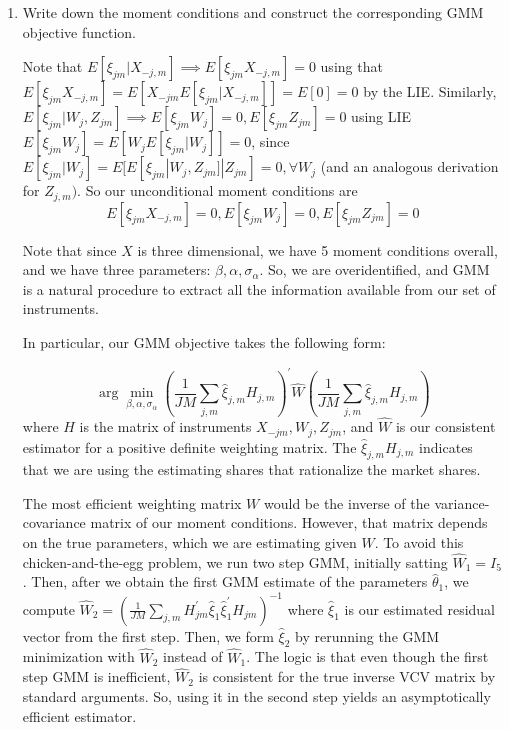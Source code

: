 \documentclass{article}
\begin{document}
\begin{enumerate}
\begin{enumerate}
    \item Write down the moment conditions and construct the corresponding GMM objective
function.
\begin{answer}
Note that $E[\xi_{jm} | X_{-j,m}] \implies E[\xi_{jm} X_{-j,m}]=0$ using that $E[\xi_{jm} X_{-j,m}]= E[X_{-jm} E[\xi_{jm} |X_{-j,m}]]=E[0]=0$ by the LIE. Similarly, $E[\xi_{jm} | W_j,Z_{jm}] \implies E[\xi_{jm}W_j] = 0, E[\xi_{jm} Z_{jm}]=0$ using LIE $E[\xi_{jm} W_{j}]= E[W_{j} E[\xi_{jm} |W_{j}]]= 0$,  since $E[\xi_{jm} |W_{j}] = E[E[\xi_{jm} |W_{j},Z_{{jm}}]|Z_{jm}] =0, \forall W_{j} $ (and an analogous derivation for $Z_{j,m} )$. So our unconditional moment conditions are 
    $$  E[\xi_{jm} X_{-j,m}]=0,E[\xi_{jm}W_j] = 0, E[\xi_{jm} Z_{jm}]=0 $$

    Note that since $X$ is three dimensional, we have 5 moment conditions overall, and we have three parameters: $\beta, \alpha, \sigma_{\alpha}$. So, we are overidentified, and GMM is a natural procedure to extract all the information available from our set of instruments. 

    In particular, our GMM objective takes the following form:

    $$ \arg \min_{\beta,\alpha,\sigma_{\alpha}} \left( \frac{1}{JM} \sum_{j,m} \hat \xi_{j,m}H_{j,m} \right)^\prime \hat W \left( \frac{1}{JM} \sum_{j,m} \hat\xi_{j,m}H_{j,m} \right)$$ where $H$ is the matrix of instruments $X_{-jm}, W_j, Z_{jm}$, and $\hat W$ is our consistent estimator for a positive definite weighting matrix. The $\hat \xi_{j,m}H_{j,m}$ indicates that we are using the estimating shares that rationalize the market shares.

    The most efficient weighting matrix $W$ would be the inverse of the variance-covariance matrix of our moment conditions. However, that matrix depends on the true parameters, which we are estimating given $W$. To avoid this chicken-and-the-egg problem, we run two step GMM, initially satting
    $\hat W_1 = I_{5}$. Then, after we obtain the first GMM estimate of the parameters $\hat 
\theta_1$, we  compute $\hat W_{2} = (\frac{1}{JM}\sum_{j,m}H_{jm}^\prime\hat\xi_1\hat\xi_1^\prime H_{jm})^{-1}$ where $\hat\xi_1$ is our estimated residual vector from the first step. Then, we form $\hat\xi_2$ by rerunning the GMM minimization with $\hat W_2$ instead of $\hat W_1$. The logic is that even though the first step GMM is inefficient, $\hat W_{2}$ is consistent for the true inverse VCV matrix by standard arguments. So, using it in the second step yields an asymptotically efficient estimator. 
\end{answer}
    

\end{enumerate}
\end{enumerate}
\end{document}
